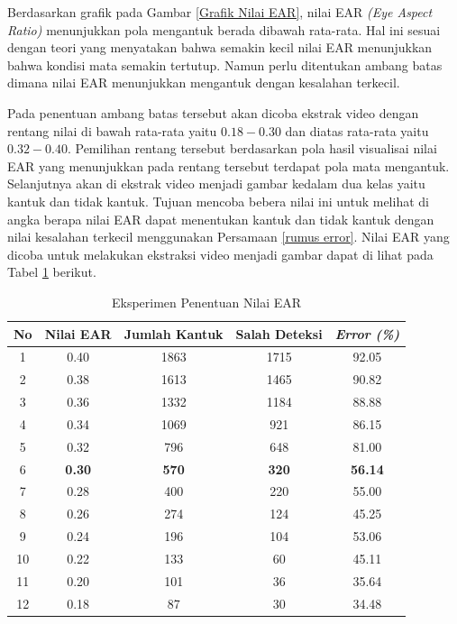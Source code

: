             Berdasarkan grafik pada Gambar \ref{Grafik Nilai EAR}, nilai EAR \textit{(Eye Aspect Ratio)} menunjukkan pola mengantuk berada dibawah rata-rata. Hal ini sesuai dengan teori yang menyatakan bahwa semakin kecil nilai EAR menunjukkan bahwa kondisi mata semakin tertutup. Namun perlu ditentukan ambang batas dimana nilai EAR menunjukkan mengantuk dengan kesalahan terkecil.
            
            Pada penentuan ambang batas tersebut akan dicoba ekstrak video dengan rentang nilai di bawah rata-rata yaitu $0.18 - 0.30$ dan diatas rata-rata yaitu $0.32 - 0.40$. Pemilihan rentang tersebut berdasarkan pola hasil visualisai nilai EAR yang menunjukkan pada rentang tersebut terdapat pola mata mengantuk. Selanjutnya akan di ekstrak video menjadi gambar kedalam dua kelas yaitu kantuk dan tidak kantuk. Tujuan mencoba bebera nilai ini untuk melihat di angka berapa nilai EAR dapat menentukan kantuk dan tidak kantuk dengan nilai kesalahan terkecil menggunakan Persamaan \ref{rumus error}. Nilai EAR yang dicoba untuk melakukan ekstraksi video menjadi gambar dapat di lihat pada Tabel \ref{Penentuan Nilai EAR} berikut.\\


            \begin{table}[h]
            \centering
            \caption{Eksperimen Penentuan Nilai EAR}
            \begin{tabular}{ccccc}
                \toprule
                 \textbf{No} &\textbf{Nilai EAR} & \textbf{Jumlah Kantuk} & \textbf{Salah Deteksi} & \textbf{\textit{Error (\%)}} \\
                \midrule
                   
                      
                         1 & 0.40 & 1863 & 1715 & 92.05 \\
                         2 &  0.38 & 1613 & 1465 & 90.82 \\
                         3 & 0.36 & 1332 & 1184 & 88.88 \\
                         4 &  0.34 & 1069 & 921  & 86.15 \\
                         5 &  0.32 & 796  & 648  & 81.00 \\
                         6 & \textbf{0.30} &\textbf{ 570} & \textbf{320} & \textbf{56.14} \\
                         7 & 0.28 & 400 & 220 & 55.00 \\
                         8 &  0.26 & 274 & 124 & 45.25 \\
                         9 &  0.24 & 196 & 104 & 53.06 \\
                         10 &  0.22 & 133 & 60& 45.11 \\
                         11 &  0.20 & 101 & 36  & 35.64 \\
                         12 &  0.18 & 87  & 30  & 34.48\\
    
                    \bottomrule
                \end{tabular}
                \label{Penentuan Nilai EAR}
            \end{table}

